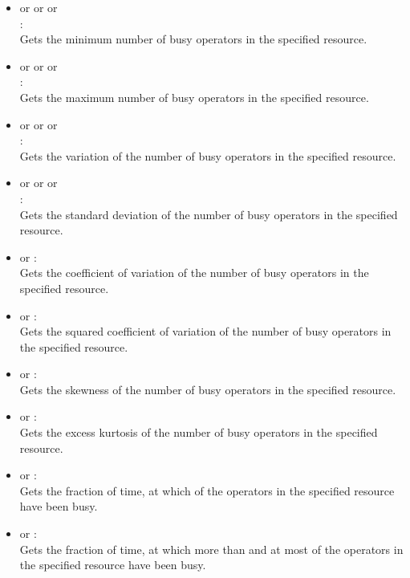 \begin{itemize}
\item
{} or  or  or\\
:\\
Gets the minimum number of busy operators in the specified resource.

\item
{} or  or  or\\
:\\
Gets the maximum number of busy operators in the specified resource.

\item
{} or  or  or\\
:\\
Gets the variation of the number of busy operators in the specified resource.

\item
{} or  or  or\\
:\\
Gets the standard deviation of the number of busy operators in the specified resource.

\item
{} or :\\
Gets the coefficient of variation of the number of busy operators in the specified resource.

\item
{} or :\\
Gets the squared coefficient of variation of the number of busy operators in the specified resource.

\item
{} or :\\
Gets the skewness of the number of busy operators in the specified resource.

\item
{} or :\\
Gets the excess kurtosis of the number of busy operators in the specified resource.

\item
{} or :\\
Gets the fraction of time, at which  of the operators in the specified resource have been busy.

\item
{} or :\\
Gets the fraction of time, at which more than  and at most  of the operators in the specified resource have been busy.

\end{itemize}



